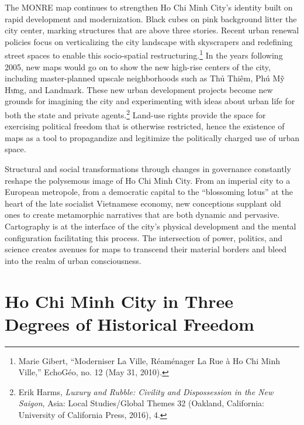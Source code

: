 The MONRE map continues to strengthen Ho Chi Minh City's identity built on rapid development and modernization. Black cubes on pink background litter the city center, marking structures that are above three stories. Recent urban renewal policies focus on verticalizing the city landscape with skyscrapers and redefining street spaces to enable this socio-spatial restructuring.\footnote{Marie Gibert, “Moderniser La Ville, Réaménager La Rue à Ho Chi Minh Ville,” EchoGéo, no. 12 (May 31, 2010).} In the years following 2005, new maps would go on to show the new high-rise centers of the city, including master-planned upscale neighborhoods such as Thủ Thiêm, Phú Mỹ Hưng, and Landmark. These new urban development projects become new grounds for imagining the city and experimenting with ideas about urban life for both the state and private agents.\footnote{Erik Harms, \textit{Luxury and Rubble: Civility and Dispossession in the New Saigon}, Asia: Local Studies/Global Themes 32 (Oakland, California: University of California Press, 2016), 4.} Land-use rights provide the space for exercising political freedom that is otherwise restricted, hence the existence of maps as a tool to propagandize and legitimize the politically charged use of urban space.

Structural and social transformations through changes in governance constantly reshape the polysemous image of Ho Chi Minh City. From an imperial city to a European metropole, from a democratic capital to the “blossoming lotus” at the heart of the late socialist Vietnamese economy, new conceptions supplant old ones to create metamorphic narratives that are both dynamic and pervasive. Cartography is at the interface of the city’s physical development and the mental configuration facilitating this process. The intersection of power, politics, and science creates avenues for maps to transcend their material borders and bleed into the realm of urban consciousness.

\section{Ho Chi Minh City in Three Degrees of Historical Freedom}

